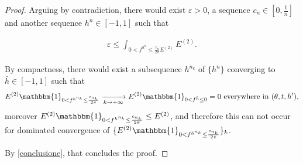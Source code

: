 \documentclass[a4paper,10pt,reqno]{amsart}
\numberwithin{equation}{subsection}
\numberwithin{figure}{subsection}
\begin{document}
\begin{proof}
Arguing by contradiction, there would exist $\varepsilon>0$, a sequence $c_n\in[0,\frac{1}{n}]$ and another sequence $h^n\in[-1,1]$ such that

\begin{align*}
\varepsilon\leq\int_{0< f^{h^n}\leq\frac{c_n}{2\pi}E^{(2)}}E^{(2)}.
\end{align*}

By compactness, there would exist a subsequence ${h}^{n_k}$ of $\{h^n\}$ converging to $\bar h\in[-1,1]$ such that
\[
E^{(2)}\mathbbm{1}_{0< f^{h^{n_k}}\leq \frac{c_{n_k}}{2\pi}}\xrightarrow[k\to+\infty]{}E^{(2)}\mathbbm{1}_{0< f^{\bar h}\leq0}=0\textrm{ everywhere in }(\theta,t,h'),
\]
moreover $E^{(2)}\mathbbm{1}_{0<f^{h^{n_k}}\leq \frac{c_{n_k}}{2\pi}}\leq E^{(2)}$, and therefore this can not occur for dominated convergence of $\{E^{(2)}\mathbbm{1}_{0<f^{h^{n_k}}\leq \frac{c_{n_k}}{2\pi}}\}_k$.

By \eqref{conclusione}, that concludes the proof.
\end{proof}
\end{document}
